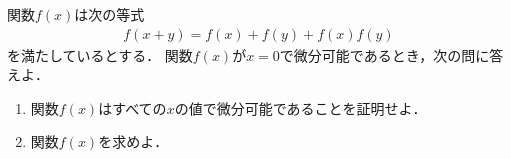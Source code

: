 \documentclass[../../main.tex]{subfiles}
\begin{document}
関数$f(x)$は次の等式
\begin{align}
  f(x+y)=f(x)+f(y)+f(x)f(y)
\end{align}
を満たしているとする．
関数$f(x)$が$x=0$で微分可能であるとき，次の問に答えよ．
\begin{enumerate}
  \item 関数$f(x)$はすべての$x$の値で微分可能であることを証明せよ．
  \item 関数$f(x)$を求めよ．
\end{enumerate}
\end{document}
